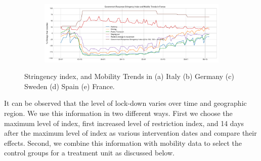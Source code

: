 \documentclass[preprint,authoryear,12pt]{elsarticle}
\begin{document}
\begin{figure}
	\begin{subfigure}[b]{\textwidth}
		\centering
		\includegraphics[width=0.9\linewidth,height=0.19\textheight]{Mobility Trends in France}
	\end{subfigure}
	
	\caption[Mobility Trends]{Stringency index, and Mobility Trends in (a) Italy (b) Germany (c) Sweden (d) Spain (e) France.}
	\label{fig2} 
\end{figure}

    It can be observed that the level of lock-down varies over time and geographic region. We use this information in two different ways. First we choose the maximum level of index, first increased level of restriction index, and 14 days after the maximum level of index as various intervention dates and compare their effects. Second, we combine this information with mobility data to select the control groups for a treatment unit as discussed below.
    
\end{document}
